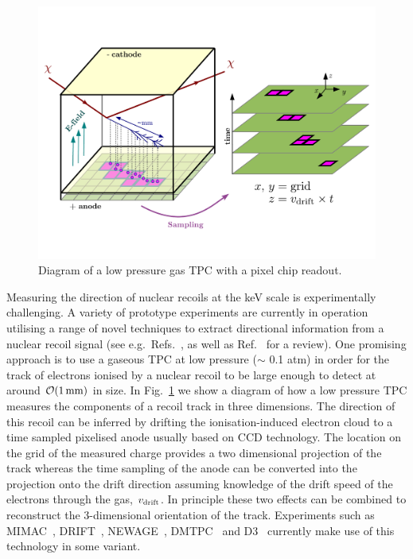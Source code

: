 \begin{figure}
	\includegraphics[trim = 0mm 20mm 0mm 20mm, clip, width=\textwidth]{Figures/TPC.pdf}
	\caption[Diagram of a low pressure gas TPC]{Diagram of a low pressure gas TPC with a pixel chip readout.}
	\label{fig:TPC}
\end{figure}

Measuring the direction of nuclear recoils at the keV scale is experimentally challenging. A variety of prototype experiments are currently in operation utilising a range of novel techniques to extract directional information from a nuclear recoil signal (see e.g.~Refs.~\cite{Cappella:2013,Capparelli:2014lua,Aleksandrov:2016fyr}, as well as Ref.~\cite{Ahlen:2009ev} for a review). One promising approach is to use a gaseous TPC at low pressure ($\sim$ 0.1 atm) in order for the track of electrons ionised by a nuclear recoil to be large enough to detect at around $\mathcal{O}(1\,{\rm mm})$ in size. In Fig.~\ref{fig:TPC} we show a diagram of how a low pressure TPC measures the components of a recoil track in three dimensions. The direction of this recoil can be inferred by drifting the ionisation-induced electron cloud to a time sampled pixelised anode usually based on CCD technology. The location on the grid of the measured charge provides a two dimensional projection of the track whereas the time sampling of the anode can be converted into the projection onto the drift direction assuming knowledge of the drift speed of the electrons through the gas, $v_{\rm drift}$. In principle these two effects can be combined to reconstruct the 3-dimensional orientation of the track. Experiments such as MIMAC~\cite{Riffard:2013psa,Riffard:2016mgw}, DRIFT~\cite{Daw:2011wq,Battat:2014van}, NEWAGE~\cite{Nakamura:2015iza,Miuchi:2010hn}, DMTPC~\cite{Monroe:2011er,Leyton:2016nit} and D3~\cite{Jaegle:2011rn} currently make use of this technology in some variant. 

